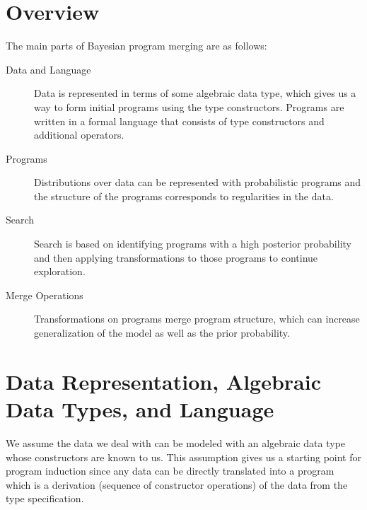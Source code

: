 \documentclass[a4paper,10pt]{article}
\begin{document}
\section{Overview}
The main parts of Bayesian program merging are as follows:
\begin{description}
\item[Data and Language] Data is represented in terms of some algebraic data type, which gives us a way to form initial programs using the type constructors.  Programs are written in a formal language that consists of type constructors and additional operators.
\item[Programs]  Distributions over data can be represented with probabilistic programs and the structure of the programs corresponds to regularities in the data.
\item[Search] Search is based on identifying programs with a high posterior probability and then applying transformations to those programs to continue exploration.
\item[Merge Operations] Transformations on programs merge program structure, which can increase generalization of the model as well as the prior probability.
\end{description}
\section{Data Representation, Algebraic Data Types, and Language}
We assume the data we deal with can be modeled with an algebraic data type whose constructors are known to us.  This assumption gives us a starting point for program induction since any data can be directly translated into a program which is a derivation (sequence of constructor operations) of the data from the type specification. 
\end{document}
